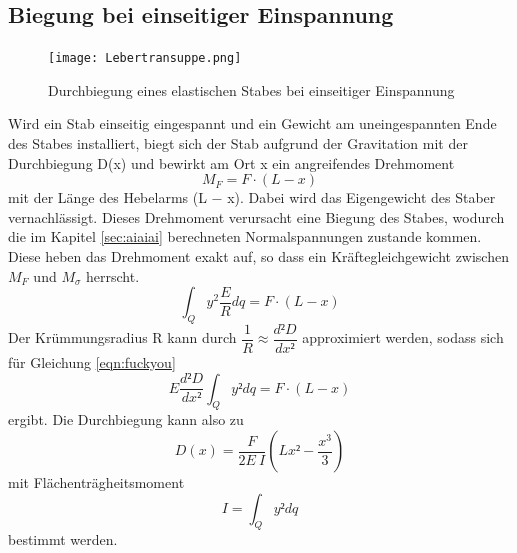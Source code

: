 \subsection{Biegung bei einseitiger Einspannung}
    \begin{figure}
        \centering
        \texttt{[image: Lebertransuppe.png]}
        \caption{Durchbiegung eines elastischen Stabes bei einseitiger Einspannung}
        \label{fig:lebertran}
    \end{figure}
    Wird ein Stab einseitig eingespannt und ein Gewicht am uneingespannten Ende des Stabes 
    installiert, biegt sich der Stab aufgrund der Gravitation mit der Durchbiegung D(x) 
    und bewirkt am Ort x ein angreifendes Drehmoment
    \begin{equation}
        M_F = F \cdot (L − x)
    \end{equation}
    mit der Länge des Hebelarms (L − x). Dabei wird das Eigengewicht des Staber vernachlässigt.
    Dieses Drehmoment verursacht eine Biegung des Stabes, wodurch die im Kapitel 
    \ref{sec:aiaiai} berechneten Normalspannungen zustande kommen. Diese heben das 
    Drehmoment exakt auf, so dass ein Kräftegleichgewicht zwischen $M_F$ und $M_{\sigma}$ herrscht.
    \begin{equation}
        \int_Q y^2 \dfrac{E}{R}dq  = F \cdot (L − x)
    \end{equation}
    Der Krümmungsradius R kann durch $\dfrac{1}{R} \approx 
    \dfrac{d²D}{dx²}$ approximiert werden, sodass sich für Gleichung \ref{eqn:fuckyou}
    \begin{equation}
        E \dfrac{d²D}{dx²} \int_Q y² dq=F\cdot(L-x)
    \end{equation}
    ergibt. Die Durchbiegung kann also zu
    \begin{equation}
        D(x)=\dfrac{F}{2 E \ I}(Lx²-\dfrac{x^3}{3})
    \end{equation}
    mit Flächenträgheitsmoment
    \begin{equation}
        I = \int_Q y² dq
    \end{equation}
    bestimmt werden.

